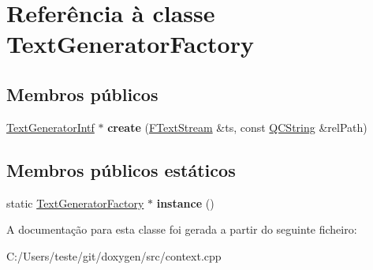 \hypertarget{class_text_generator_factory}{\section{Referência à classe Text\-Generator\-Factory}
\label{class_text_generator_factory}
}
\subsection*{Membros públicos}
\begin{DoxyCompactItemize}
\item 
\hypertarget{class_text_generator_factory_a43149148236f011c507de066d59bd141}{\hyperlink{class_text_generator_intf}{Text\-Generator\-Intf} $\ast$ {\bfseries create} (\hyperlink{class_f_text_stream}{F\-Text\-Stream} \&ts, const \hyperlink{class_q_c_string}{Q\-C\-String} \&rel\-Path)}\label{class_text_generator_factory_a43149148236f011c507de066d59bd141}

\end{DoxyCompactItemize}
\subsection*{Membros públicos estáticos}
\begin{DoxyCompactItemize}
\item 
\hypertarget{class_text_generator_factory_ad963e79ef8c87413675eadb491ea9dab}{static \hyperlink{class_text_generator_factory}{Text\-Generator\-Factory} $\ast$ {\bfseries instance} ()}\label{class_text_generator_factory_ad963e79ef8c87413675eadb491ea9dab}

\end{DoxyCompactItemize}


A documentação para esta classe foi gerada a partir do seguinte ficheiro\-:\begin{DoxyCompactItemize}
\item 
C\-:/\-Users/teste/git/doxygen/src/context.\-cpp\end{DoxyCompactItemize}
